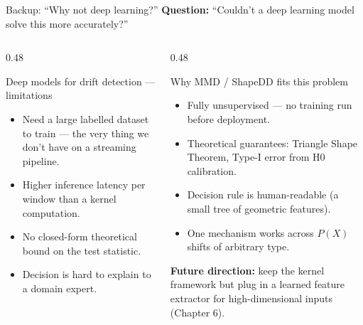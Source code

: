 \documentclass[aspectratio=169,10pt]{beamer}
\begin{document}
\begin{frame}{Backup: ``Why not deep learning?''}
	\textbf{Question:} ``Couldn't a deep learning model solve this more accurately?''

	\vspace{0.5em}
	\begin{columns}[T]
		\begin{column}{0.48\textwidth}
			\begin{alertblock}{Deep models for drift detection --- limitations}
				\begin{itemize}
					\item Need a large labelled dataset to train --- the very thing we don't have on a streaming pipeline.
					\item Higher inference latency per window than a kernel computation.
					\item No closed-form theoretical bound on the test statistic.
					\item Decision is hard to explain to a domain expert.
				\end{itemize}
			\end{alertblock}
		\end{column}
		\begin{column}{0.48\textwidth}
			\begin{exampleblock}{Why MMD / ShapeDD fits this problem}
				\begin{itemize}
					\item Fully unsupervised --- no training run before deployment.
					\item Theoretical guarantees: Triangle Shape Theorem, Type-I error from H0 calibration.
					\item Decision rule is human-readable (a small tree of geometric features).
					\item One mechanism works across $P(X)$ shifts of arbitrary type.
				\end{itemize}
			\end{exampleblock}

			\vspace{0.3em}
			\textbf{Future direction:} keep the kernel framework but plug in a learned feature extractor for high-dimensional inputs (Chapter 6).
		\end{column}
	\end{columns}
\end{frame}
\end{document}
